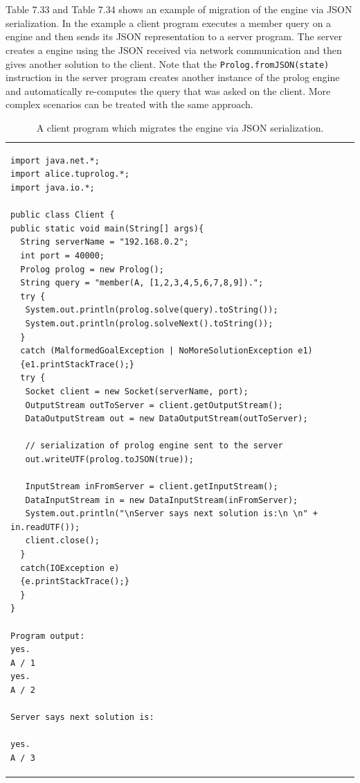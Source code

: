 \\ \\
Table 7.33 and Table 7.34 shows an example of migration of the \tuprolog{} engine via JSON serialization. In the example a client program executes a member query on a \tuprolog{} engine and then sends its JSON representation to a server program. The server creates
a \tuprolog{} engine using the JSON received via network communication and then gives another solution to the client. Note that the \texttt{Prolog.fromJSON(state)} instruction in the server program creates another instance of the prolog engine and automatically re-computes the query that was asked on the client. More complex scenarios can be treated with the same approach.

\begin{table}
{\footnotesize
	\begin{tabular}[-1cm]{p{12cm}}
	\begin{verbatim}
import java.net.*;
import alice.tuprolog.*;
import java.io.*;
	
public class Client {
public static void main(String[] args){
  String serverName = "192.168.0.2";
  int port = 40000;
  Prolog prolog = new Prolog();
  String query = "member(A, [1,2,3,4,5,6,7,8,9]).";
  try {
   System.out.println(prolog.solve(query).toString());
   System.out.println(prolog.solveNext().toString());
  } 
  catch (MalformedGoalException | NoMoreSolutionException e1)
  {e1.printStackTrace();}
  try {
   Socket client = new Socket(serverName, port);
   OutputStream outToServer = client.getOutputStream();
   DataOutputStream out = new DataOutputStream(outToServer);
   
   // serialization of prolog engine sent to the server
   out.writeUTF(prolog.toJSON(true)); 
   
   InputStream inFromServer = client.getInputStream();
   DataInputStream in = new DataInputStream(inFromServer);
   System.out.println("\nServer says next solution is:\n \n" + in.readUTF());
   client.close();
  } 
  catch(IOException e) 
  {e.printStackTrace();}
  }
}

Program output:
yes.
A / 1
yes.
A / 2

Server says next solution is:

yes.
A / 3
\end{verbatim}
\end{tabular}
\caption{A client program which migrates the \tuprolog{} engine via JSON serialization.}
}
\end{table} 

